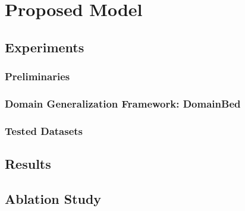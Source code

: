 \chapter{Proposed Model}

\section{Experiments}
\subsection{Preliminaries}
\subsection{Domain Generalization Framework: DomainBed}
\subsection{Tested Datasets}

\section{Results}

\section{Ablation Study}